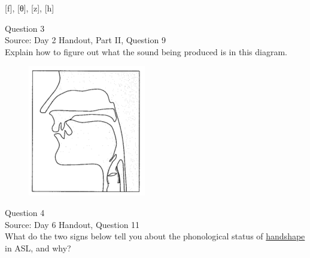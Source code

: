 \documentclass[12pt]{article}
\begin{document}
{[f]}, {[θ]}, {[z]}, {[h]}


\newpage

{\large Question 3}\\

Source: Day 2 Handout, Part II, Question 9\\

Explain how to figure out what the sound being produced is in this diagram.\\

\begin{figure}[H]
\includegraphics{../images/sagittal_t.png}
\end{figure}

\newpage

{\large Question 4}\\

Source: Day 6 Handout, Question 11\\

What do the two signs below tell you about the phonological status of \underline{handshape} in ASL, and why?\\
\end{document}
